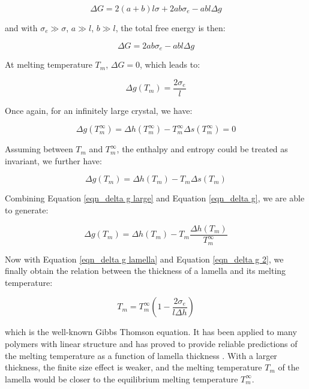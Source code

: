 \begin{equation}
\label{eqn_delta G lamella}
\Delta G = 2(a+b)l\sigma + 2ab\sigma_{e} - abl\Delta g
\end{equation}

\noindent
and with $\sigma_{e}\gg\sigma$, $a\gg l$, $b\gg l$, the total free energy is then:

\begin{equation}
\label{eqn_delta G lamella reduced}
\Delta G = 2ab\sigma_{e} - abl\Delta g
\end{equation}

At melting temperature $T_{m}$, $\Delta G = 0$, which leads to:

\begin{equation}
\label{eqn_delta g lamella}
\Delta g (T_{m}) = \dfrac{2\sigma_{e}}{l}
\end{equation}

Once again, for an infinitely large crystal, we have:

\begin{equation}
\label{eqn_delta g large}
\Delta g (T_{m}^{\infty}) = \Delta h (T_{m}^{\infty}) - T_{m}^{\infty}\Delta s (T_{m}^{\infty}) = 0
\end{equation}

Assuming between $T_{m}$ and $T_{m}^{\infty}$, the enthalpy and entropy could be treated as invariant, we further have:

\begin{equation}
\label{eqn_delta g}
\Delta g (T_{m}) = \Delta h (T_{m}) - T_{m}\Delta s (T_{m})
\end{equation}

Combining Equation \ref{eqn_delta g large} and Equation \ref{eqn_delta g}, we are able to generate:

\begin{equation}
\label{eqn_delta g 2}
\Delta g (T_{m}) = \Delta h (T_{m}) - T_{m}\dfrac{\Delta h (T_{m})}{T_{m}^{\infty}}
\end{equation}

Now with Equation \ref{eqn_delta g lamella} and Equation \ref{eqn_delta g 2}, we finally obtain the relation between the thickness of a lamella and its melting temperature:

\begin{equation}
\label{eqn_GT}
T_{m} = T_{m}^{\infty} (1 - \dfrac{2\sigma_{e}}{l \Delta h})
\end{equation}

\noindent
which is the well-known Gibbs Thomson equation. It has been applied to many polymers with linear structure and has proved to provide reliable predictions of the melting temperature as a function of lamella thickness \cite{KojiYamada2003}. With a larger thickness, the finite size effect is weaker, and the melting temperature $T_{m}$ of the lamella would be closer to the equilibrium melting temperature $T_{m}^{\infty}$.

